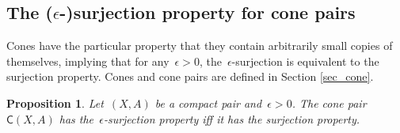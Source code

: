 \documentclass[english,11pt]{article}
\theoremstyle{plain}
\newtheorem{proposition}{Proposition}[section]
\theoremstyle{remark}
\newtheorem{remark}{Remark}[section]
\theoremstyle{definition}
\newtheorem{example}{Example}[section]
\newcommand{\Sp}{\mathbb{S}}
\newcommand{\BB}{\mathbb{B}}
\newcommand{\unit}{\odot}%
\newcommand{\N}{\mathbb{N}}
\newcommand{\C}[1]{\mathsf{C}(#1)}%
\begin{document}
\subsection{The (\texorpdfstring{$\epsilon$}{epsilon}-)surjection property for cone pairs}

%
%
%

Cones have the particular property that they contain arbitrarily small copies of themselves, implying that for any~$\epsilon>0$, the~$\epsilon$-surjection is equivalent to the surjection property. Cones and cone pairs are defined in Section \ref{sec_cone}.
\begin{proposition}\label{prop_cone_epsilon}
Let~$(X,A)$ be a compact pair and~$\epsilon>0$. The cone pair~$\C{X,A}$ has the~$\epsilon$-surjection property iff it has the surjection property.
\end{proposition}
\end{document}
